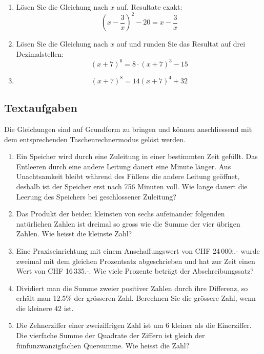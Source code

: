   \begin{enumerate}
  \item Lösen Sie die Gleichung nach $x$ auf. Resultate exakt:
    $$\left(x-\frac{3}{x}\right)^2 - 20 = x - \frac{3}{x}$$

  \item Lösen Sie die Gleichung nach $x$ auf und runden Sie das
    Resultat auf drei Dezimalstellen:
    $$(x+7)^6 = 8\cdot (x+7)^3 - 15$$

  \item $$(x+7)^8 = 14(x+7)^4 + 32$$
  \end{enumerate}


\subsection{Textaufgaben}

Die Gleichungen sind auf Grundform zu bringen und können anschliessend
mit dem entsprechenden Taschenrechnermodus gelöst werden.

\begin{enumerate}
  \item Ein Speicher wird durch eine Zuleitung in einer bestimmten
    Zeit gefüllt. Das Entleeren durch eine andere Leitung dauert eine
    Minute länger. Aus Unachtsamkeit bleibt während des Füllens die
    andere Leitung geöffnet, deshalb ist der Speicher erst nach 756
    Minuten voll. Wie lange dauert die Leerung des Speichers bei
    geschlossener Zuleitung?

    \item Das Produkt der beiden kleinsten von sechs aufeinander
      folgenden natürlichen Zahlen ist dreimal so gross wie die Summe
      der vier übrigen Zahlen. Wie heisst die kleinste Zahl?

      \item Eine Praxiseinrichtung mit einem Anschaffungswert von CHF
        24\,000;.- wurde zweimal mit dem gleichen Prozentsatz
        abgeschrieben und hat zur Zeit einen Wert von CHF 16\,335.-.
        Wie viele Prozente beträgt der Abschreibungssatz?

      \item Dividiert man die Summe zweier positiver Zahlen durch ihre
        Differenz, so erhält man 12.5\% der grösseren Zahl.
        Berechnen Sie die grössere Zahl, wenn die kleinere 42 ist.

        \item Die Zehnerziffer einer zweiziffrigen Zahl ist um 6
          kleiner als die Einerziffer. Die vierfache Summe der
          Quadrate der Ziffern ist gleich der fünfunzwanzigfachen
          Quersumme. Wie heisst die Zahl?
\end{enumerate}





